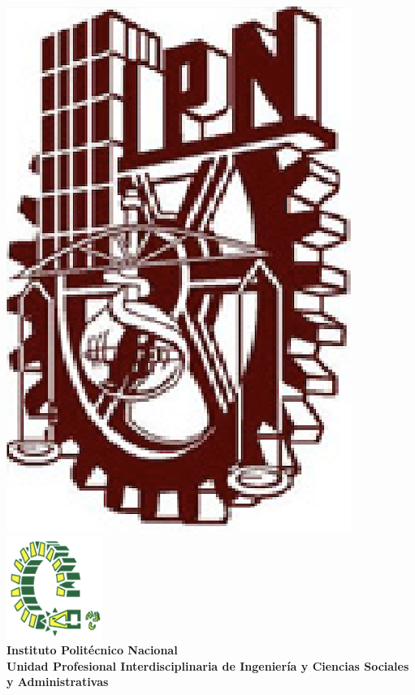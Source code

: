 
\begin{titlepage} %

    \begin{center}

	   \includegraphics[scale=0.15]{imagenes/ipn}\includegraphics[scale=0.7]{imagenes/upiicsa}
	   \large \textbf{\\Instituto Polit\'ecnico Nacional}
	   \large \textbf{\\Unidad Profesional Interdisciplinaria de Ingeniería y Ciencias Sociales y Administrativas}



\end{center}
\end{titlepage}
